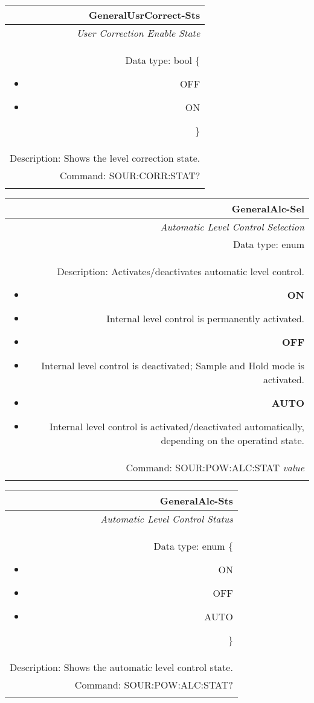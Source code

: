 \documentclass[openany]{article}
\begin{document}
		\begin{tabular}{N}
			\hline
			\bfseries GeneralUsrCorrect-Sts \\ \hline
			\emph{User Correction Enable State} \\
			Data type: bool \{\begin{itemize}[noitemsep]
				\small
				\item[] OFF
				\item[] ON
			\end{itemize}\} \\
			Description: Shows the level correction state. \\
			Command: SOUR:CORR:STAT? \\
			\\

		\end{tabular}


		\begin{tabular}{N}
			\hline
			\bfseries GeneralAlc-Sel \\ \hline
			\emph{Automatic Level Control Selection} \\
			Data type: enum \\
			Description: Activates/deactivates automatic level control. \begin{itemize}[noitemsep]
				\small
				\item[] \textbf{ON}
				\item[] Internal level control is permanently activated.
				\item[] \textbf{OFF}
				\item[] Internal level control is deactivated; Sample and Hold mode is activated.
				\item[] \textbf{AUTO}
				\item[] Internal level control is activated/deactivated automatically, depending on the operatind state.
			\end{itemize} \\
			Command: SOUR:POW:ALC:STAT \emph{value} \\
			\\ 

		\end{tabular}


		\begin{tabular}{N}
			\hline
			\bfseries GeneralAlc-Sts \\ \hline
			\emph{Automatic Level Control Status} \\
			Data type: enum \{\begin{itemize}[noitemsep]
				\small
				\item[] ON
				\item[] OFF
				\item[] AUTO
			\end{itemize}\} \\
			Description: Shows the automatic level control state. \\
			Command: SOUR:POW:ALC:STAT? \\
			\\ 

		\end{tabular}
\end{document}
